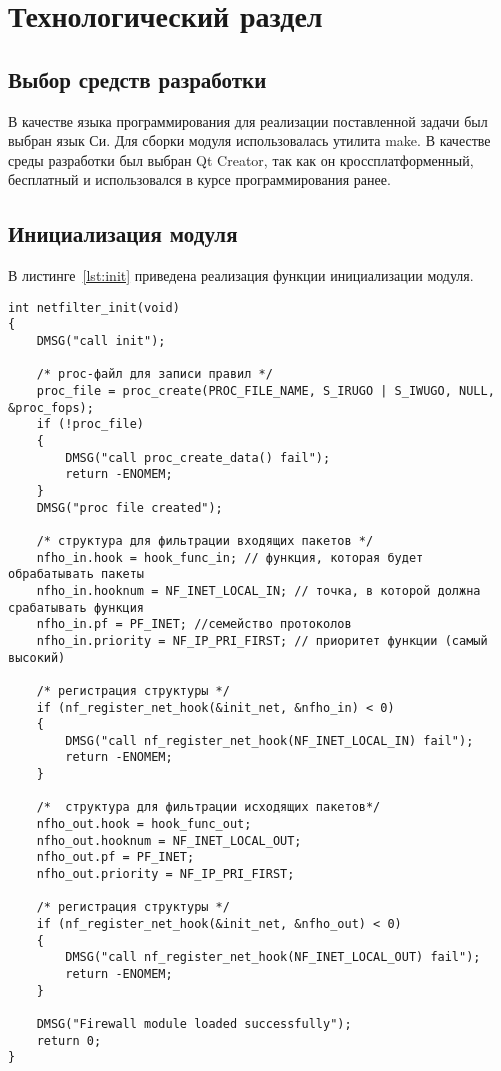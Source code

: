 \chapter{Технологический раздел}

\section{Выбор средств разработки}

В качестве языка программирования для реализации поставленной задачи был выбран язык Си. Для сборки модуля использовалась утилита make.
В качестве среды разработки был выбран Qt Creator\cite{qt}, так как он кроссплатформенный, бесплатный и использовался в курсе программирования ранее. 


\section{Инициализация модуля}
В листинге~\ref{lst:init} приведена реализация функции инициализации модуля.

\begin{lstlisting}[caption = {Функция инициализации модуля}, label=lst:init]
int netfilter_init(void)
{
	DMSG("call init");
	
	/* proc-файл для записи правил */
	proc_file = proc_create(PROC_FILE_NAME, S_IRUGO | S_IWUGO, NULL, &proc_fops);
	if (!proc_file) 
	{
		DMSG("call proc_create_data() fail");
		return -ENOMEM;
	}
	DMSG("proc file created");	
	
	/* структура для фильтрации входящих пакетов */
	nfho_in.hook = hook_func_in; // функция, которая будет обрабатывать пакеты
	nfho_in.hooknum = NF_INET_LOCAL_IN; // точка, в которой должна срабатывать функция
	nfho_in.pf = PF_INET; //семейство протоколов
	nfho_in.priority = NF_IP_PRI_FIRST; // приоритет функции (самый высокий)
	
	/* регистрация структуры */
	if (nf_register_net_hook(&init_net, &nfho_in) < 0)
	{
		DMSG("call nf_register_net_hook(NF_INET_LOCAL_IN) fail");
		return -ENOMEM;
	}
	
	/*  структура для фильтрации исходящих пакетов*/
	nfho_out.hook = hook_func_out;
	nfho_out.hooknum = NF_INET_LOCAL_OUT;
	nfho_out.pf = PF_INET;
	nfho_out.priority = NF_IP_PRI_FIRST;
	
	/* регистрация структуры */
	if (nf_register_net_hook(&init_net, &nfho_out) < 0)
	{
		DMSG("call nf_register_net_hook(NF_INET_LOCAL_OUT) fail");
		return -ENOMEM;
	}
	
	DMSG("Firewall module loaded successfully");
	return 0;
}
\end{lstlisting}



